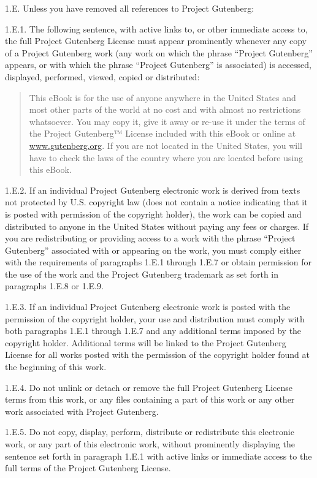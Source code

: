 \documentclass[11pt,openany,oneside]{book}
\begin{document}
1.E. Unless you have removed all references to Project Gutenberg: 

1.E.1. The following sentence, with active links to, or other immediate access to, the full Project Gutenberg License must appear prominently whenever any copy of a Project Gutenberg work (any work on which the phrase “Project Gutenberg” appears, or with which the phrase “Project Gutenberg” is associated) is accessed, displayed, performed, viewed, copied or distributed: 

\begin{quote}
This eBook is for the use of anyone anywhere in the United States and most other parts of the world at no cost and with almost no restrictions whatsoever. You may copy it, give it away or re-use it under the terms of the Project Gutenberg™ License included with this eBook or online at \href{https://www.gutenberg.org}{\uline{www.gutenberg.org}}. If you are not located in the United States, you will have to check the laws of the country where you are located before using this eBook. 

\end{quote}
1.E.2. If an individual Project Gutenberg electronic work is derived from texts not protected by U.S. copyright law (does not contain a notice indicating that it is posted with permission of the copyright holder), the work can be copied and distributed to anyone in the United States without paying any fees or charges. If you are redistributing or providing access to a work with the phrase “Project Gutenberg” associated with or appearing on the work, you must comply either with the requirements of paragraphs 1.E.1 through 1.E.7 or obtain permission for the use of the work and the Project Gutenberg trademark as set forth in paragraphs 1.E.8 or 1.E.9. 

1.E.3. If an individual Project Gutenberg electronic work is posted with the permission of the copyright holder, your use and distribution must comply with both paragraphs 1.E.1 through 1.E.7 and any additional terms imposed by the copyright holder. Additional terms will be linked to the Project Gutenberg License for all works posted with the permission of the copyright holder found at the beginning of this work. 

1.E.4. Do not unlink or detach or remove the full Project Gutenberg License terms from this work, or any files containing a part of this work or any other work associated with Project Gutenberg. 

1.E.5. Do not copy, display, perform, distribute or redistribute this electronic work, or any part of this electronic work, without prominently displaying the sentence set forth in paragraph 1.E.1 with active links or immediate access to the full terms of the Project Gutenberg License. 
\end{document}
